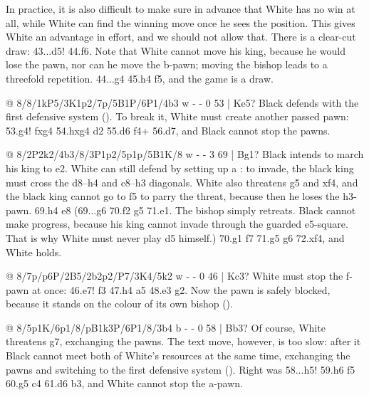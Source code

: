 In practice, it is also difficult to make sure in advance that White has no win at all, while White can find the winning move once he sees the position. This gives White an advantage in effort, and we should not allow that. There is a clear-cut draw: 43...\B d5! 44.\B f6. Note that White cannot move his king, because he would lose the pawn, nor can he move the b-pawn; moving the bishop leads to a threefold repetition. 44...\K g4 45.\B h4 \K f5, and the game is a draw.

@ 8/8/1kP5/3K1p2/7p/5B1P/6P1/4b3 w - - 0 53 | Ke5?
Black defends with the first defensive system (). To break it, White must create another passed pawn: 53.g4! fxg4 54.hxg4 \B d2 55.\K d6 \B f4+ 56.\K d7, and Black cannot stop the pawns.

@ 8/2P2k2/4b3/8/3P1p2/5p1p/5B1K/8 w - - 3 69 | Bg1?
Black intends to march his king to e2. White can still defend by setting up a : to invade, the black king must cross the d8--h4 and c8--h3 diagonals. White also threatens \B g5 and \B xf4, and the black king cannot go to f5 to parry the threat, because then he loses the h3-pawn. 69.\B h4 \K e8 (69...\K g6 70.\B f2 \K g5 71.\B e1. The bishop simply retreats. Black cannot make progress, because his king cannot invade through the guarded e5-square. That is why White must never play d5 himself.) 70.\K g1 \K f7 71.\B g5 \K g6 72.\B xf4, and White holds.

@ 8/7p/p6P/2B5/2b2p2/P7/3K4/5k2 w - - 0 46 | Kc3?
White must stop the f-pawn at once: 46.\B e7! f3 47.\B h4 a5 48.\K e3 \K g2. Now the pawn is safely blocked, because it stands on the colour of its own bishop ().

@ 8/5p1K/6p1/8/pB1k3P/6P1/8/3b4 b - - 0 58 | Bb3?
Of course, White threatens \K g7, exchanging the pawns. The text move, however, is too slow: after it Black cannot meet both of White's resources at the same time, exchanging the pawns and switching to the first defensive system (). Right was 58...\B h5! 59.\K h6 f5 60.\K g5 \K c4 61.\B d6 \K b3, and White cannot stop the a-pawn.

